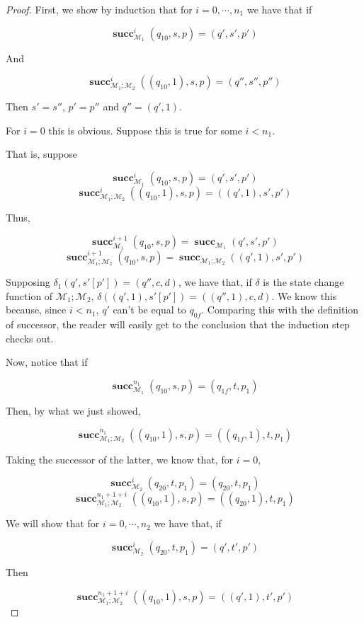 \documentclass{article}
\newcommand{\M}{\mathcal{M}}
\DeclareMathOperator{\suc}{\mathbf{succ}}
\begin{document}
	\begin{proof}
	
	First, we show by induction that for $i = 0, \cdots, n_1$ we have that if
	
	\[\suc^{i}_{\M_1} (q_{10}, s, p) = (q', s', p')\]
	
	And
	
	\[\suc^{i}_{\M_1;\M_2} ((q_{10}, 1), s, p) = (q'', s'', p'')\]
	
	Then $s' = s''$, $p' = p''$ and $q'' = (q', 1)$.
	
	For $i = 0$ this is obvious. Suppose this is true for some $i < n_1$.
	
	That is, suppose 
	
	\[\suc^{i}_{\M_1} (q_{10}, s, p) = (q', s', p')\]
	\[\suc^{i}_{\M_1;\M_2} ((q_{10}, 1), s, p) = ((q', 1), s', p')\]
	
	Thus,
	
	\[\suc^{i+1}_{\M_1} (q_{10}, s, p) = \suc_{\M_1} (q', s', p')\]
	\[\suc^{i+1}_{\M_1;\M_2} (q_{10}, s, p) = \suc_{\M_1;\M_2} ((q',1), s', p')\]
	
	Supposing $\delta_1(q', s'[p']) = (q'', c, d)$, we have that, if $\delta$ is the state change function of $\M_1;\M_2$, $\delta((q', 1), s'[p']) = ((q'', 1), c, d)$. We know this because, since $i < n_1$, $q'$ can't be equal to $q_{0f}$. Comparing this with the definition of successor, the reader will easily get to the conclusion that the induction step checks out. %
	
	Now, notice that if
	
	\[\suc^{n_1}_{\M_1} (q_{10}, s, p) = (q_{1f}, t, p_1)\]
	
	Then, by what we just showed,
	
	\[\suc^{n_1}_{\M_1;\M_2} ((q_{10}, 1), s, p) = ((q_{1f}, 1), t, p_1)\]
	
	Taking the successor of the latter, we know that, for $i = 0$,
	
	\[\suc^{i}_{\M_2} (q_{20}, t, p_1) = (q_{20}, t, p_1)\]
	\[\suc^{n_1+1+i}_{\M_1;\M_2} ((q_{10}, 1), s, p) = ((q_{20}, 1), t, p_1)\]
	
	We will show that for $i = 0, \cdots, n_2$ we have that, if
	
	\[\suc^{i}_{\M_2} (q_{20}, t, p_1) = (q', t', p')\]
	
	Then
	
	\[\suc^{n_1+1+i}_{\M_1;\M_2} ((q_{10}, 1), s, p) = ((q', 1), t', p')\]
	

\end{proof}
\end{document}
